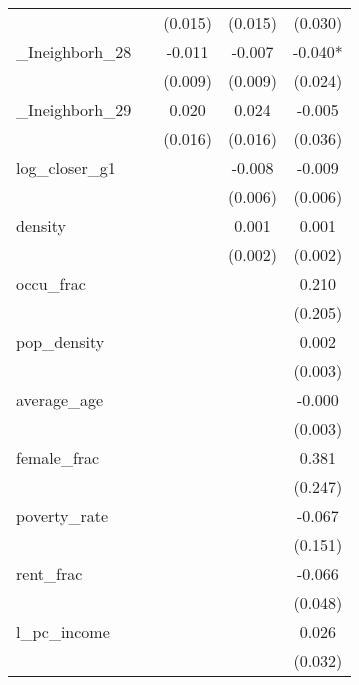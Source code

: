 {\begin{tabular}{l*{4}{c}}
          &            &  (0.015)   &  (0.015)   &  (0.030)   \\
\addlinespace
\_Ineighborh\_28&            &   -0.011   &   -0.007   &   -0.040*  \\
          &            &  (0.009)   &  (0.009)   &  (0.024)   \\
\addlinespace
\_Ineighborh\_29&            &    0.020   &    0.024   &   -0.005   \\
          &            &  (0.016)   &  (0.016)   &  (0.036)   \\
\addlinespace
log\_closer\_g1&            &            &   -0.008   &   -0.009   \\
          &            &            &  (0.006)   &  (0.006)   \\
\addlinespace
density   &            &            &    0.001   &    0.001   \\
          &            &            &  (0.002)   &  (0.002)   \\
\addlinespace
occu\_frac &            &            &            &    0.210   \\
          &            &            &            &  (0.205)   \\
\addlinespace
pop\_density&            &            &            &    0.002   \\
          &            &            &            &  (0.003)   \\
\addlinespace
average\_age&            &            &            &   -0.000   \\
          &            &            &            &  (0.003)   \\
\addlinespace
female\_frac&            &            &            &    0.381   \\
          &            &            &            &  (0.247)   \\
\addlinespace
poverty\_rate&            &            &            &   -0.067   \\
          &            &            &            &  (0.151)   \\
\addlinespace
rent\_frac &            &            &            &   -0.066   \\
          &            &            &            &  (0.048)   \\
\addlinespace
l\_pc\_income&            &            &            &    0.026   \\
          &            &            &            &  (0.032)   \\

\end{tabular}}
